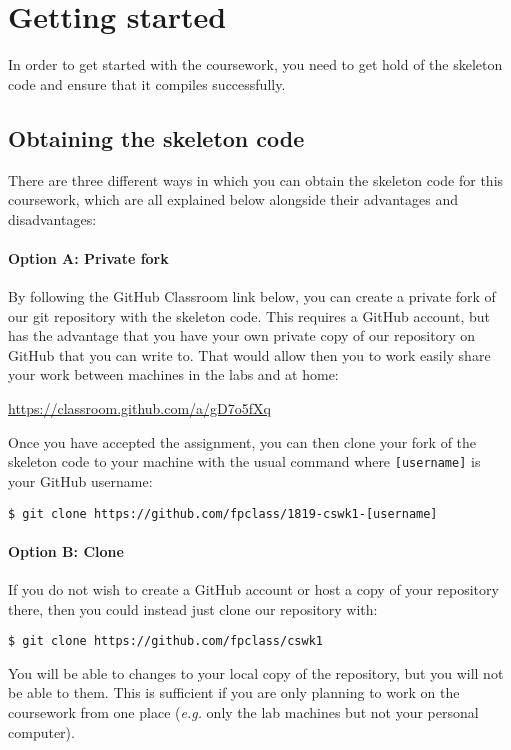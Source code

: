 
\section{Getting started}

In order to get started with the coursework, you need to get hold of the skeleton code and ensure that it compiles successfully. 

\subsection{Obtaining the skeleton code}

There are three different ways in which you can obtain the skeleton code for this coursework, which are all explained below alongside their advantages and disadvantages:

\paragraph{Option A: Private fork} By following the GitHub Classroom link below, you can create a private fork of our git repository with the skeleton code. This requires a GitHub account, but has the advantage that you have your own private copy of our repository on GitHub that you can write to. That would allow then you to work easily share your work between machines in the labs and at home:
\begin{center}
	\url{https://classroom.github.com/a/gD7o5fXq}
\end{center}
Once you have accepted the assignment, you can then clone your fork of the skeleton code to your machine with the usual  command where \texttt{\small [username]} is your GitHub username:
\begin{verbatim}
$ git clone https://github.com/fpclass/1819-cswk1-[username]
\end{verbatim}

\paragraph{Option B: Clone} If you do not wish to create a GitHub account or host a copy of your repository there, then you could instead just clone our repository with:
\begin{verbatim}
$ git clone https://github.com/fpclass/cswk1
\end{verbatim}
You will be able to  changes to your local copy of the repository, but you will not be able to  them. This is sufficient if you are only planning to work on the coursework from one place (\emph{e.g.} only the lab machines but not your personal computer).

